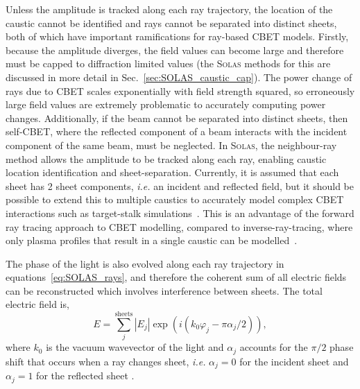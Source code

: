 Unless the amplitude is tracked along each ray trajectory, the location of the caustic cannot be identified and rays cannot be separated into distinct sheets, both of which have important ramifications for ray-based \ac{CBET} models.
Firstly, because the amplitude diverges, the field values can become large and therefore must be capped to diffraction limited values (the \textsc{Solas} methods for this are discussed in more detail in Sec.~\ref{sec:SOLAS_caustic_cap}).
The power change of rays due to \ac{CBET} scales exponentially with field strength squared, so erroneously large field values are extremely problematic to accurately computing power changes.
Additionally, if the beam cannot be separated into distinct sheets, then self-\ac{CBET}, where the reflected component of a beam interacts with the incident component of the same beam, must be neglected.
In \textsc{Solas}, the neighbour-ray method allows the amplitude to be tracked along each ray, enabling caustic location identification and sheet-separation.
Currently, it is assumed that each sheet has 2 sheet components, \textit{i.e.} an incident and reflected field, but it should be possible to extend this to multiple caustics to accurately model complex \ac{CBET} interactions such as target-stalk simulations~\cite{igumenshchev_effects_2009,igumenshchev_three-dimensional_2016,gatu_johnson_impact_2020}.
This is an advantage of the forward ray tracing approach to \ac{CBET} modelling, compared to inverse-ray-tracing, where only plasma profiles that result in a single caustic can be modelled~\cite{colaitis_inverse_2021}.

The phase of the light is also evolved along each ray trajectory in equations~\ref{eq:SOLAS_rays}, and therefore the coherent sum of all electric fields can be reconstructed which involves interference between sheets.
The total electric field is,
\begin{equation}%
    \label{eq:SOLAS_Ecoherent}
    E = \sum_{j}^{\text{sheets}} |E_j|\exp{\left( i(k_0\varphi_j-\pi\alpha_j/2) \right)},
\end{equation}
where $k_0$ is the vacuum wavevector of the light and $\alpha_j$ accounts for the $\pi/2$ phase shift that occurs when a ray changes sheet, \textit{i.e.} $\alpha_j=0$ for the incident sheet and $\alpha_j=1$ for the reflected sheet \cite{follett_validation_2022}.

